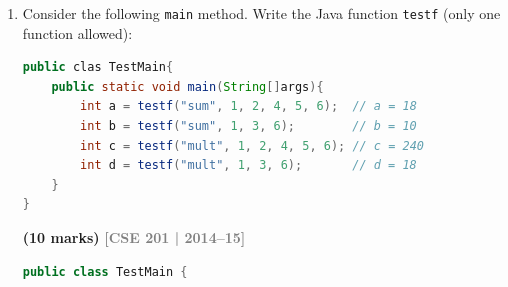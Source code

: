 \documentclass[12pt,a3paper]{article}
\newcommand{\yr}[1]{\hfill\textcolor{gray}{\small\textbf{[#1]}}}
\newcommand{\mk}[1]{\textcolor{orange!70!black}{\small\textbf{(#1 marks)}}}
\begin{document}
\begin{enumerate}
\begin{tcolorbox}[enhanced,breakable,ansbox,
  colback=cB!4,colframe=cB,boxrule=0.8pt,arc=5pt,
  title={\textbf{Answer --- Max and Min of \texttt{n} Command-Line Integers}},
  fonttitle=\bfseries\color{white},colbacktitle=cB]

\begin{lstlisting}[language=Java]
public class MaxMin {
    public static void main(String[] args) {
        if (args.length == 0) {
            System.out.println("No input provided.");
            return;
        }
        int max = Integer.parseInt(args[0]);
        int min = Integer.parseInt(args[0]);

        for (int i = 1; i < args.length; i++) {
            int val = Integer.parseInt(args[i]);
            if (val > max) max = val;
            if (val < min) min = val;
        }
        System.out.println("Maximum: " + max);
        System.out.println("Minimum: " + min);
    }
}
\end{lstlisting}

\textbf{Sample run:}
\begin{lstlisting}
$ java MaxMin 4 7 -2 15 3
Maximum: 15
Minimum: -2
\end{lstlisting}

\end{tcolorbox}

\item Consider the following \texttt{main} method. Write the Java function \texttt{testf} (only one function allowed):
\begin{lstlisting}[language=Java]
public clas TestMain{
    public static void main(String[]args){
        int a = testf("sum", 1, 2, 4, 5, 6);  // a = 18
        int b = testf("sum", 1, 3, 6);        // b = 10
        int c = testf("mult", 1, 2, 4, 5, 6); // c = 240
        int d = testf("mult", 1, 3, 6);       // d = 18
    }
}
\end{lstlisting}
\mk{10}
\yr{CSE 201 | 2014--15}

\begin{tcolorbox}[enhanced,breakable,ansbox,
  colback=cB!4,colframe=cB,boxrule=0.8pt,arc=5pt,
  title={\textbf{Answer --- \texttt{testf()} with Varargs}},
  fonttitle=\bfseries\color{white},colbacktitle=cB]

\begin{lstlisting}[language=Java]
public class TestMain {


\end{lstlisting}
\end{tcolorbox}
\end{enumerate}
\end{document}
